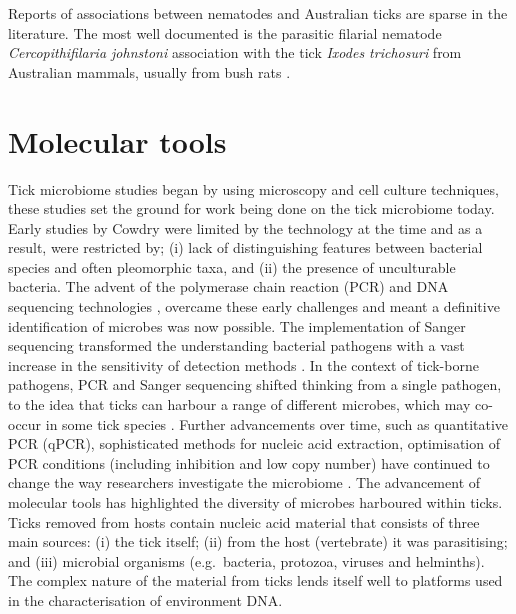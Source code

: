 \documentclass[a4paper, nobind]{templates/ociamthesis}
\begin{document}
Reports of associations between nematodes and Australian ticks are sparse in the literature. The most well documented is the parasitic filarial nematode \emph{Cercopithifilaria johnstoni} association with the tick \emph{Ixodes trichosuri} from Australian mammals, usually from bush rats \autocite{sprattAspectsLifeHistory1988a,mccannGenomeSequenceAustralian2021}.

\hypertarget{molecular-tools}{%
\section{Molecular tools}\label{molecular-tools}}

Tick microbiome studies began by using microscopy and cell culture techniques, these studies set the ground for work being done on the tick microbiome today.
Early studies by Cowdry \autocite*{cowdryGroupMicroorganismsTransmitted1925} were limited by the technology at the time and as a result, were restricted by; (i) lack of distinguishing features between bacterial species and often pleomorphic taxa, and (ii) the presence of unculturable bacteria.
The advent of the polymerase chain reaction (PCR) \autocite{mullisSpecificSynthesisDNA1987} and DNA sequencing technologies \autocite{sangerDNASequencingChaintermination1977}, overcame these early challenges and meant a definitive identification of microbes was now possible.
The implementation of Sanger sequencing transformed the understanding bacterial pathogens with a vast increase in the sensitivity of detection methods \autocite{chakravortyDetailedAnalysis16S2007,macdonaldFrameworkDevelopingValidating2016}.
In the context of tick-borne pathogens, PCR and Sanger sequencing shifted thinking from a single pathogen, to the idea that ticks can harbour a range of different microbes, which may co-occur in some tick species \autocite{brouquiGuidelinesDiagnosisTickborne2004,scolesPhylogeneticAnalysisFrancisellalike2004,parolaTickFleaborneRickettsial2005}.
Further advancements over time, such as quantitative PCR (qPCR), sophisticated methods for nucleic acid extraction, optimisation of PCR conditions (including inhibition and low copy number) have continued to change the way researchers investigate the microbiome \autocite{hoffmannAnalysisTickSurface2020,koloAnaplasmaPhagocytophilumOther2020}.
The advancement of molecular tools has highlighted the diversity of microbes harboured within ticks.
Ticks removed from hosts contain nucleic acid material that consists of three main sources: (i) the tick itself; (ii) from the host (vertebrate) it was parasitising; and (iii) microbial organisms (e.g.~bacteria, protozoa, viruses and helminths).
The complex nature of the material from ticks lends itself well to platforms used in the characterisation of environment DNA.
\end{document}
